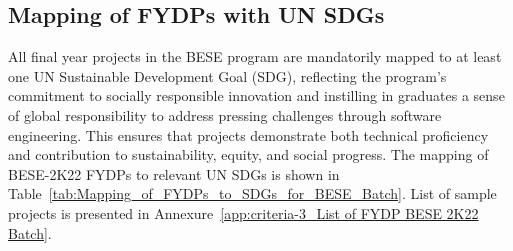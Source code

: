 \hypertarget{sec:fydpsdg}{%
\subsection{Mapping of FYDPs with UN SDGs}\label{sec:fydpsdg}}

All final year projects in the BESE program are mandatorily mapped to at least one UN Sustainable Development Goal (SDG), reflecting the program's commitment to socially responsible innovation and instilling in graduates a sense of global responsibility to address pressing challenges through software engineering. This ensures that projects demonstrate both technical proficiency and contribution to sustainability, equity, and social progress. The mapping of BESE-2K22 FYDPs to relevant UN SDGs is shown in Table~\ref{tab:Mapping_of_FYDPs_to_SDGs_for_BESE_Batch}. List of sample projects is presented in Annexure~\ref{app:criteria-3_List of FYDP BESE 2K22 Batch}.

